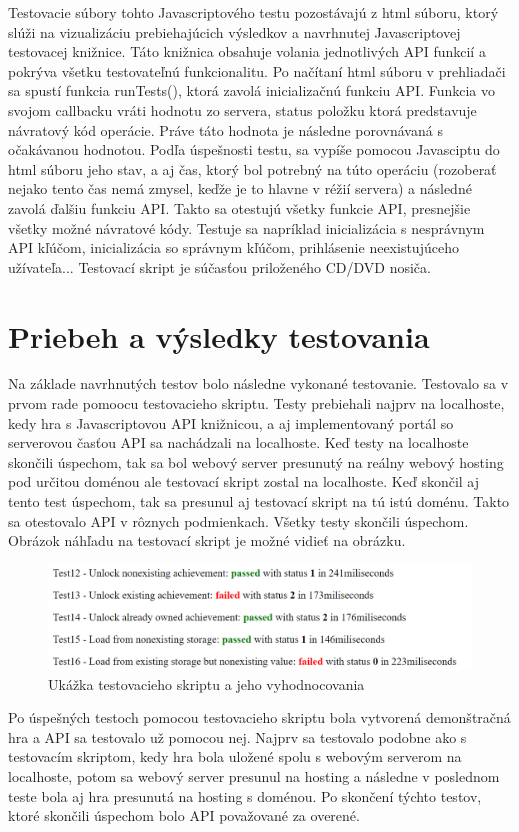 Testovacie súbory tohto Javascriptového testu pozostávajú z html súboru, ktorý slúži na vizualizáciu prebiehajúcich výsledkov a navrhnutej Javascriptovej testovacej knižnice. Táto knižnica obsahuje volania jednotlivých API funkcií a pokrýva všetku testovateľnú funkcionalitu. Po načítaní html súboru v prehliadači sa spustí funkcia runTests(), ktorá zavolá inicializačnú funkciu API. Funkcia vo svojom callbacku vráti hodnotu zo servera, status položku ktorá predstavuje návratový kód operácie. Práve táto hodnota je následne porovnávaná s očakávanou hodnotou. Podľa úspešnosti testu, sa vypíše pomocou Javasciptu do html súboru jeho stav, a aj čas, ktorý bol potrebný na túto operáciu (rozoberať nejako tento čas nemá zmysel, keďže je to hlavne v réžií servera) a následné zavolá ďalšiu funkciu API. Takto sa otestujú všetky funkcie API, presnejšie všetky možné návratové kódy. Testuje sa napríklad inicializácia s nesprávnym API kľúčom, inicializácia so správnym kľúčom, prihlásenie neexistujúceho užívateľa... Testovací skript je súčasťou priloženého CD/DVD nosiča.

\section{Priebeh a výsledky testovania}
Na základe navrhnutých testov bolo následne vykonané testovanie. Testovalo sa v prvom rade pomoocu testovacieho skriptu. Testy prebiehali najprv na localhoste, kedy hra s Javascriptovou API knižnicou, a aj implementovaný portál so serverovou časťou API sa nachádzali na localhoste. Keď testy na localhoste skončili úspechom, tak sa bol webový server presunutý na reálny webový hosting pod určitou doménou ale testovací skript zostal na localhoste. Keď skončil aj tento test úspechom, tak sa presunul aj testovací skript na tú istú doménu. Takto sa otestovalo API v rôznych podmienkach. Všetky testy skončili úspechom. Obrázok náhľadu na testovací skript je možné vidieť na obrázku. 
\begin{figure}[h]
  \centering
  \includegraphics[scale=0.45]{fig/tests.png}
  \caption{Ukážka testovacieho skriptu a jeho vyhodnocovania}
  \label{fig:test}
\end{figure}
Po úspešných testoch pomocou testovacieho skriptu bola vytvorená demonštračná hra a API sa testovalo už pomocou nej. Najprv sa testovalo podobne ako s testovacím skriptom, kedy hra bola uložené spolu s webovým serverom na localhoste, potom sa webový server presunul na hosting a následne v poslednom teste bola aj hra presunutá na hosting s doménou. Po skončení týchto testov, ktoré skončili úspechom bolo API považované za overené. 

